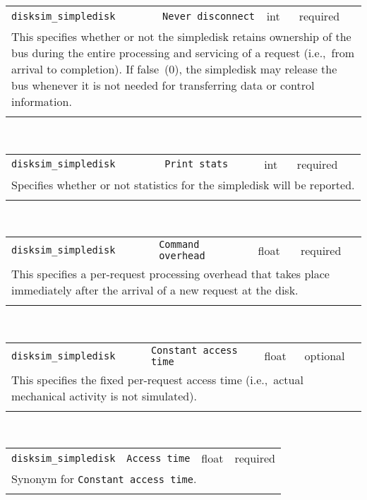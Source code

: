 \noindent 
\begin{tabular}{|p{1.5in}|p{3.5in}|p{0.5in}|p{0.5in}|}
\cline{1-4}
\texttt{disksim\_simpledisk} & \texttt{Never disconnect} & int & required \\ 
\cline{1-4}
\multicolumn{4}{|p{6in}|}{
This specifies whether or not the simpledisk retains ownership of the bus
during the entire processing and servicing of a request (i.e.,~from
arrival to completion). If false~(0), the simpledisk may release the
bus whenever it is not needed for transferring data or control
information.
}\\ 
\cline{1-4}
\multicolumn{4}{p{5in}}{}\\
\end{tabular}\\ 
\noindent 
\begin{tabular}{|p{1.5in}|p{3.5in}|p{0.5in}|p{0.5in}|}
\cline{1-4}
\texttt{disksim\_simpledisk} & \texttt{Print stats} & int & required \\ 
\cline{1-4}
\multicolumn{4}{|p{6in}|}{
Specifies whether or not statistics for the simpledisk will be reported.
}\\ 
\cline{1-4}
\multicolumn{4}{p{5in}}{}\\
\end{tabular}\\ 
\noindent 
\begin{tabular}{|p{1.5in}|p{3.5in}|p{0.5in}|p{0.5in}|}
\cline{1-4}
\texttt{disksim\_simpledisk} & \texttt{Command overhead} & float & required \\ 
\cline{1-4}
\multicolumn{4}{|p{6in}|}{
This specifies a per-request processing overhead that takes place
immediately after the arrival of a new request at the disk.
}\\ 
\cline{1-4}
\multicolumn{4}{p{5in}}{}\\
\end{tabular}\\ 
\noindent 
\begin{tabular}{|p{1.5in}|p{3.5in}|p{0.5in}|p{0.5in}|}
\cline{1-4}
\texttt{disksim\_simpledisk} & \texttt{Constant access time} & float & optional \\ 
\cline{1-4}
\multicolumn{4}{|p{6in}|}{
This specifies the fixed per-request access time (i.e.,~actual mechanical
activity is not simulated).
}\\ 
\cline{1-4}
\multicolumn{4}{p{5in}}{}\\
\end{tabular}\\ 
\noindent 
\begin{tabular}{|p{1.5in}|p{3.5in}|p{0.5in}|p{0.5in}|}
\cline{1-4}
\texttt{disksim\_simpledisk} & \texttt{Access time} & float & required \\ 
\cline{1-4}
\multicolumn{4}{|p{6in}|}{
Synonym for \texttt{Constant access time}.
}\\ 
\cline{1-4}
\multicolumn{4}{p{5in}}{}\\
\end{tabular}\\ 
